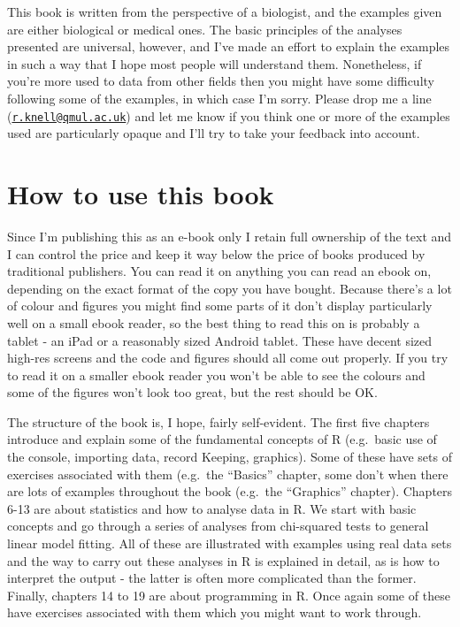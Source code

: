 \documentclass[
]{book}
\begin{document}
This book is written from the perspective of a biologist, and the examples given are either biological or medical ones. The basic principles of the analyses presented are universal, however, and I've made an effort to explain the examples in such a way that I hope most people will understand them. Nonetheless, if you're more used to data from other fields then you might have some difficulty following some of the examples, in which case I'm sorry. Please drop me a line (\href{mailto:r.knell@qmul.ac.uk}{\nolinkurl{r.knell@qmul.ac.uk}}) and let me know if you think one or more of the examples used are particularly opaque and I'll try to take your feedback into account.

\hypertarget{how-to-use-this-book}{%
\section{How to use this book}\label{how-to-use-this-book}}

Since I'm publishing this as an e-book only I retain full ownership of the text and I can control the price and keep it way below the price of books produced by traditional publishers. You can read it on anything you can read an ebook on, depending on the exact format of the copy you have bought. Because there's a lot of colour and figures you might find some parts of it don't display particularly well on a small ebook reader, so the best thing to read this on is probably a tablet - an iPad or a reasonably sized Android tablet. These have decent sized high-res screens and the code and figures should all come out properly. If you try to read it on a smaller ebook reader you won't be able to see the colours and some of the figures won't look too great, but the rest should be OK.

The structure of the book is, I hope, fairly self-evident. The first five chapters introduce and explain some of the fundamental concepts of R (e.g.~basic use of the console, importing data, record Keeping, graphics). Some of these have sets of exercises associated with them (e.g.~the ``Basics'' chapter, some don't when there are lots of examples throughout the book (e.g.~the ``Graphics'' chapter). Chapters 6-13 are about statistics and how to analyse data in R. We start with basic concepts and go through a series of analyses from chi-squared tests to general linear model fitting. All of these are illustrated with examples using real data sets and the way to carry out these analyses in R is explained in detail, as is how to interpret the output - the latter is often more complicated than the former. Finally, chapters 14 to 19 are about programming in R. Once again some of these have exercises associated with them which you might want to work through.
\end{document}
